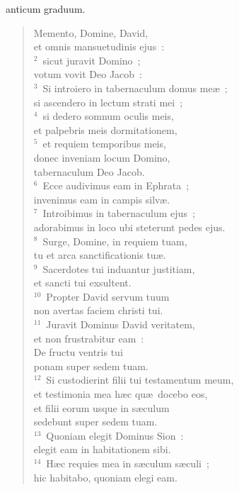 \bchapter
{}anticum graduum. \begin{flushleft}\begin{verse}\vspace{6pt}Memento, Domine, David,\\ et omnis mansuetudinis ejus~:\\
${}^{2}$~sicut juravit Domino~;\\ votum vovit Deo Jacob~:\\
${}^{3}$~Si introiero in tabernaculum domus me\ae~;\\ si ascendero in lectum strati mei~;\\
${}^{4}$~si dedero somnum oculis meis,\\ et palpebris meis dormitationem,\\
${}^{5}$~et requiem temporibus meis,\\ donec inveniam locum Domino,\\ tabernaculum Deo Jacob.\\
${}^{6}$~Ecce audivimus eam in Ephrata~;\\ invenimus eam in campis silv\ae .\\
${}^{7}$~Introibimus in tabernaculum ejus~;\\ adorabimus in loco ubi steterunt pedes ejus.\\
${}^{8}$~Surge, Domine, in requiem tuam,\\ tu et arca sanctificationis tu\ae .\\
${}^{9}$~Sacerdotes tui induantur justitiam,\\ et sancti tui exsultent.\\
${}^{10}$~Propter David servum tuum\\ non avertas faciem christi tui.\\
${}^{11}$~Juravit Dominus David veritatem,\\ et non frustrabitur eam~:\\ De fructu ventris tui\\ ponam super sedem tuam.\\
${}^{12}$~Si custodierint filii tui testamentum meum,\\ et testimonia mea h\ae c qu\ae\ docebo eos,\\ et filii eorum usque in s\ae culum\\ sedebunt super sedem tuam.\\
${}^{13}$~Quoniam elegit Dominus Sion~:\\ elegit eam in habitationem sibi.\\
${}^{14}$~H\ae c requies mea in s\ae culum s\ae culi~;\\ hic habitabo, quoniam elegi eam.\\

\end{verse}
\end{flushleft}
